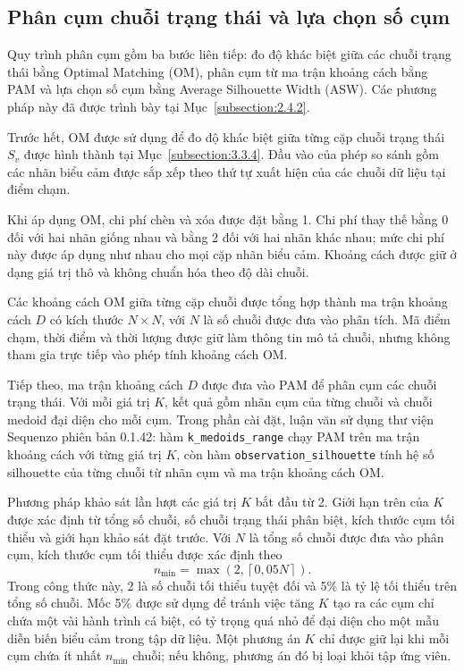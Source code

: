 \documentclass[../LuanVan.tex]{subfiles}
\begin{document}
\subsection{Phân cụm chuỗi trạng thái và lựa chọn số cụm}
\label{subsection:3.4.2}

Quy trình phân cụm gồm ba bước liên tiếp: đo độ khác biệt giữa các chuỗi trạng thái bằng Optimal Matching (OM), phân cụm từ ma trận khoảng cách bằng PAM và lựa chọn số cụm bằng Average Silhouette Width (ASW). Các phương pháp này đã được trình bày tại Mục~\ref{subsection:2.4.2}.

Trước hết, OM được sử dụng để đo độ khác biệt giữa từng cặp chuỗi trạng thái $S_v$ được hình thành tại Mục~\ref{subsection:3.3.4}. Đầu vào của phép so sánh gồm các nhãn biểu cảm được sắp xếp theo thứ tự xuất hiện của các chuỗi dữ liệu tại điểm chạm.

Khi áp dụng OM, chi phí chèn và xóa được đặt bằng 1. Chi phí thay thế bằng 0 đối với hai nhãn giống nhau và bằng 2 đối với hai nhãn khác nhau; mức chi phí này được áp dụng như nhau cho mọi cặp nhãn biểu cảm. Khoảng cách được giữ ở dạng giá trị thô và không chuẩn hóa theo độ dài chuỗi.

Các khoảng cách OM giữa từng cặp chuỗi được tổng hợp thành ma trận khoảng cách $D$ có kích thước $N\times N$, với $N$ là số chuỗi được đưa vào phân tích. Mã điểm chạm, thời điểm và thời lượng được giữ làm thông tin mô tả chuỗi, nhưng không tham gia trực tiếp vào phép tính khoảng cách OM.

Tiếp theo, ma trận khoảng cách $D$ được đưa vào PAM để phân cụm các chuỗi trạng thái. Với mỗi giá trị $K$, kết quả gồm nhãn cụm của từng chuỗi và chuỗi medoid đại diện cho mỗi cụm. Trong phần cài đặt, luận văn sử dụng thư viện Sequenzo phiên bản 0.1.42: hàm \texttt{k\_medoids\_range} chạy PAM trên ma trận khoảng cách với từng giá trị $K$, còn hàm \texttt{observation\_silhouette} tính hệ số silhouette của từng chuỗi từ nhãn cụm và ma trận khoảng cách OM.

Phương pháp khảo sát lần lượt các giá trị $K$ bắt đầu từ 2. Giới hạn trên của $K$ được xác định từ tổng số chuỗi, số chuỗi trạng thái phân biệt, kích thước cụm tối thiểu và giới hạn khảo sát đặt trước. Với $N$ là tổng số chuỗi được đưa vào phân cụm, kích thước cụm tối thiểu được xác định theo
\begin{equation}
    n_{\min}=\max\left(2,\left\lceil0{,}05N\right\rceil\right).
    \label{eq:ch3_min_cluster_size}
\end{equation}
Trong công thức này, 2 là số chuỗi tối thiểu tuyệt đối và 5\% là tỷ lệ tối thiểu trên tổng số chuỗi. Mốc 5\% được sử dụng để tránh việc tăng $K$ tạo ra các cụm chỉ chứa một vài hành trình cá biệt, có tỷ trọng quá nhỏ để đại diện cho một mẫu diễn biến biểu cảm trong tập dữ liệu. Một phương án $K$ chỉ được giữ lại khi mỗi cụm chứa ít nhất $n_{\min}$ chuỗi; nếu không, phương án đó bị loại khỏi tập ứng viên.
\end{document}
